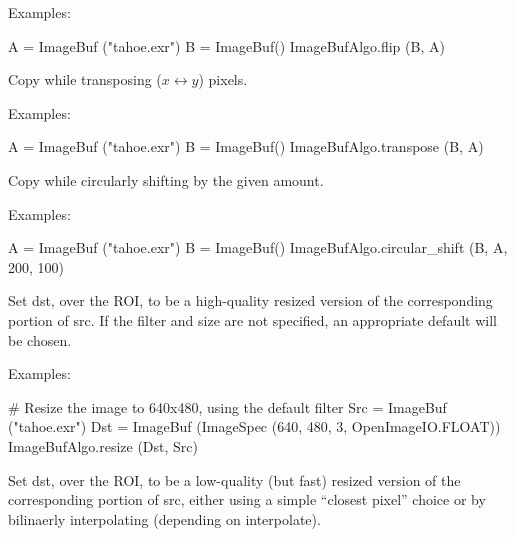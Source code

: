 \smallskip
\noindent Examples:
\begin{code}
    A = ImageBuf ("tahoe.exr")
    B = ImageBuf()
    ImageBufAlgo.flip (B, A)
\end{code}
\apiend



 
Copy while transposing ($x \leftrightarrow y$) pixels.

\smallskip
\noindent Examples:
\begin{code}
    A = ImageBuf ("tahoe.exr")
    B = ImageBuf()
    ImageBufAlgo.transpose (B, A)
\end{code}
\apiend


 

Copy while circularly shifting by the given amount. 

\smallskip
\noindent Examples:
\begin{code}
    A = ImageBuf ("tahoe.exr")
    B = ImageBuf()
    ImageBufAlgo.circular_shift (B, A, 200, 100)
\end{code}
\apiend


 
Set {\cf dst}, over the ROI, to be a high-quality resized version of the
corresponding portion of {\cf src}.  If the filter and size are not
specified, an appropriate default will be chosen.

\smallskip
\noindent Examples:
\begin{code}
    # Resize the image to 640x480, using the default filter
    Src = ImageBuf ("tahoe.exr")
    Dst = ImageBuf (ImageSpec (640, 480, 3, OpenImageIO.FLOAT))
    ImageBufAlgo.resize (Dst, Src)
\end{code}
\apiend


 
Set {\cf dst}, over the ROI, to be a low-quality (but fast) resized version
of the corresponding portion of {\cf src}, either using a simple ``closest
pixel'' choice or by bilinaerly interpolating (depending on {\cf
interpolate}).

